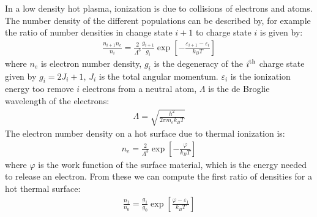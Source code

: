 \documentclass{article}
\numberwithin{equation}{section}
\begin{document}
In a low density hot plasma, ionization is due to collisions of electrons and atoms. The number density of the different populations can be described by, for example the ratio of number densities in change state $i+1$ to charge state $i$ is given by:
\begin{align}
\frac{n_{i+1} n_e}{n_i} = \frac{2}{\Lambda^3} \frac{g_{i+1}}{g_i} \exp \left[ - \frac{ \varepsilon_{i+1} - \varepsilon_i }{k_B T} \right]
\end{align}
where $n_e$ is electron number density, $g_i$ is the degeneracy of the $i^{\rm th}$ charge state given by $g_i = 2 J_i + 1$, $J_i$ is the total angular momentum. $\varepsilon_i$ is the ionization energy too remove $i$ electrons from a neutral atom, $\Lambda$ is the de Broglie wavelength of the electrons:
\begin{align}
\Lambda = \sqrt{ \frac{h^2}{2 \pi m_e k_B T}}
\end{align}
The electron number density on a hot surface due to thermal ionization is:
\begin{align}
n_e = \frac{2}{\Lambda^3} \exp \left[ - \frac{\varphi}{k_B T} \right]
\end{align}
where $\varphi$ is the work function of the surface material, which is the energy needed to release an electron.
From these we can compute the first ratio of densities for a hot thermal surface:
\begin{align}
\frac{n_1}{n_0} = \frac{g_1}{g_0} \exp \left[ \frac{ \varphi - \varepsilon_1 }{k_B T} \right]
\end{align}
\end{document}
